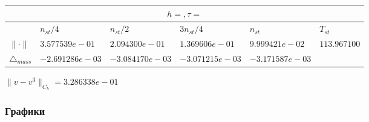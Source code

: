 \begin{tabular}{*{6}{|l}|}
    \hline
     \\
    \hline
    &$n_{st}/4 $&$ n_{st}/2$&$3n_{st}/4$&$n_{st}$&$T_{st}$ \\
    \hline
$\|\cdot \|$& $3.577539e-01$ & $2.094300e-01$ & $1.369606e-01$ & $9.999421e-02$ &$113.967100$\\
\hline
$\triangle_{mass}$& $-2.691286e-03$ & $-3.084170e-03$ & $-3.071215e-03$ & $-3.171587e-03$ &\\
\hline
\end{tabular}

$\|v-v^{3}\|_{C_h} = 3.286338e-01$
\newpage
\subsubsection{Графики}
